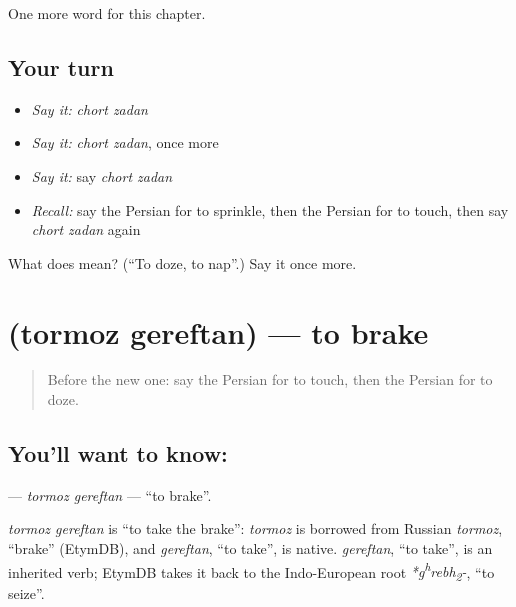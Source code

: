 \begin{grammarlens}[title={What you've built}]
One more word for this chapter.
\end{grammarlens}

\subsection*{Your turn}
\begin{itemize}
\raggedright
  \item \emph{Say it:} \emph{chort zadan}
  \item \emph{Say it:} \emph{chort zadan}, once more
  \item \emph{Say it:} say \emph{chort zadan}
  \item \emph{Recall:} say the Persian for to sprinkle, then the Persian for to touch, then say \emph{chort zadan} again
\end{itemize}

\begin{tcolorbox}[breakable,colback=teal!4,colframe=teal!35!black,title={Before you move on}]
What does   mean? (\textquotedblleft{}To doze, to nap\textquotedblright{}.) Say it once more.
\end{tcolorbox}
\section[\texorpdfstring{\fa{ترمز} \fa{گرفتن} (tormoz gereftan)}{ترمز گرفتن (tormoz gereftan)}]{  (tormoz gereftan) — to brake}

\label{lesson:FA-C148-tormoz-gereftan}



\begin{quote}
Before the new one: say the Persian for to touch, then the Persian for to doze.
\end{quote}

\subsection*{You'll want to know:  }
\textbf{ } — \emph{tormoz gereftan} — \textquotedblleft{}to brake\textquotedblright{}.

\begin{cousinweb}
\emph{tormoz gereftan} is \textquotedblleft{}to take the brake\textquotedblright{}: \emph{tormoz} is borrowed from Russian \emph{tormoz}, \textquotedblleft{}brake\textquotedblright{} (EtymDB), and \emph{gereftan}, \textquotedblleft{}to take\textquotedblright{}, is native. \emph{gereftan}, \textquotedblleft{}to take\textquotedblright{}, is an inherited verb; EtymDB takes it back to the Indo-European root \emph{*g\textsuperscript{h}rebh\textsubscript{2}-}, \textquotedblleft{}to seize\textquotedblright{}.
\end{cousinweb}


